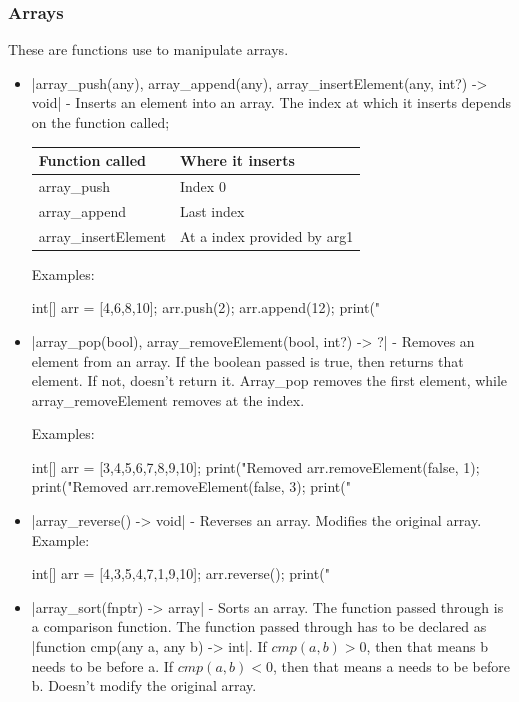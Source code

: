 \documentclass[12pt, letterpaper, oneside]{article}
\begin{document}
	\subsubsection{Arrays}
	These are functions use to manipulate arrays.
	\begin{itemize}
		\item[--] \spverb|array_push(any), array_append(any), array_insertElement(any, int?) -> void| - Inserts an element into an array. The index at which it inserts depends on the function called;
		
		
		\begin{tabular}{|p{4cm}|p{5cm}|}
			\hline
			Function called&Where it inserts\\
			\hline
			array\_push&Index 0\\
			\hline
			array\_append&Last index\\
			\hline 
			array\_insertElement&At a index provided by arg1\\
			\hline 
		\end{tabular}
		
		Examples:
		\begin{spverbatim}
			int[] arr = [4,6,8,10];
			arr.push(2);
			arr.append(12);
			print("%
		\end{spverbatim}
		\item[--] \spverb|array_pop(bool), array_removeElement(bool, int?) -> ?| - \newline Removes an element from an array. If the boolean passed is true, then returns that element. If not, doesn't return it. Array\_pop removes the first element, while array\_removeElement removes at the index.
		
		
		Examples:
		\begin{spverbatim}
			int[] arr = [3,4,5,6,7,8,9,10];
			print("Removed %
			arr.removeElement(false, 1);
			print("Removed %
			arr.removeElement(false, 3);
			print("%
		\end{spverbatim}
		\item[--] \spverb|array_reverse() -> void| - Reverses an array. Modifies the original array. Example:
		
		
		\begin{spverbatim}
			int[] arr = [4,3,5,4,7,1,9,10];
			arr.reverse();
			print("\n%
		\end{spverbatim}
		\newpage 
		\label{misc:arraySort}
		\item[--] \spverb|array_sort(fnptr) -> array| - Sorts an array. The function passed through is a comparison function. The function passed through has to be declared as \spverb|function cmp(any a, any b) -> int|. If $cmp(a,b) > 0$, then that means b needs to be before a. If $cmp(a,b) < 0$, then that means a needs to be before b. Doesn't modify the original array.
		

\end{itemize}
\end{document}
